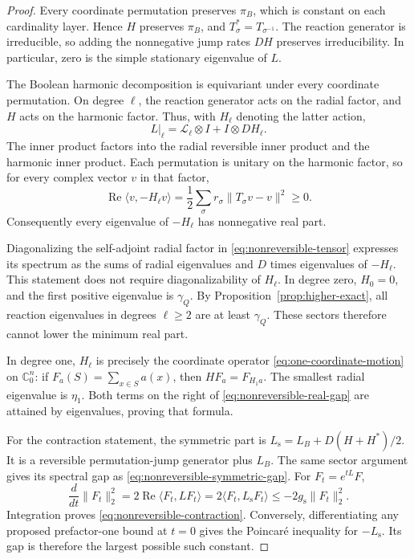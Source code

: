 \begin{proof}
Every coordinate permutation preserves $\pi_B$, which is constant on
each cardinality layer.  Hence $H$ preserves $\pi_B$, and
$T_\sigma^*=T_{\sigma^{-1}}$.  The reaction generator is irreducible,
so adding the nonnegative jump rates $DH$ preserves irreducibility.
In particular, zero is the simple stationary eigenvalue of $L$.

The Boolean harmonic decomposition is equivariant under every
coordinate permutation.  On degree $\ell$, the reaction generator
acts on the radial factor, and $H$ acts on the harmonic factor.
Thus, with $H_\ell$ denoting the latter action,
\begin{equation}\label{eq:nonreversible-tensor}
 L|_\ell=\mathcal L_\ell\otimes I+I\otimes DH_\ell.
\end{equation}
The inner product factors into the radial reversible inner product
and the harmonic inner product.  Each permutation is unitary on the
harmonic factor, so for every complex vector $v$ in that factor,
\[
 \operatorname{Re}\langle v,-H_\ell v\rangle
 =\frac12\sum_\sigma r_\sigma
       \|T_\sigma v-v\|^2\ge0.
\]
Consequently every eigenvalue of $-H_\ell$ has nonnegative real part.

Diagonalizing the self-adjoint radial factor in
\eqref{eq:nonreversible-tensor} expresses its spectrum as the sums of
radial eigenvalues and $D$ times eigenvalues of $-H_\ell$.
This statement does not require diagonalizability of $H_\ell$.
In degree zero, $H_0=0$, and the first positive eigenvalue is
$\gamma_Q$.  By Proposition~\ref{prop:higher-exact}, all reaction
eigenvalues in degrees $\ell\ge2$ are at least $\gamma_Q$.
These sectors therefore cannot lower the minimum real part.

In degree one, $H_\ell$ is precisely the coordinate operator
\eqref{eq:one-coordinate-motion} on $\mathbb C^n_0$:
if $F_a(S)=\sum_{x\in S}a(x)$, then $HF_a=F_{H_1a}$.
The smallest radial eigenvalue is $\eta_1$.
Both terms on the right of \eqref{eq:nonreversible-real-gap} are
attained by eigenvalues, proving that formula.

For the contraction statement, the symmetric part is
$L_{\mathrm{s}}=L_B+D(H+H^*)/2$.
It is a reversible permutation-jump generator plus $L_B$.
The same sector argument gives its spectral gap as
\eqref{eq:nonreversible-symmetric-gap}.  For
$F_t=e^{tL}F$,
\[
 \frac{d}{dt}\|F_t\|_2^2
 =2\operatorname{Re}\langle F_t,LF_t\rangle
 =2\langle F_t,L_{\mathrm{s}}F_t\rangle
 \le-2g_{\mathrm{s}}\|F_t\|_2^2.
\]
Integration proves \eqref{eq:nonreversible-contraction}.
Conversely, differentiating any proposed prefactor-one bound at
$t=0$ gives the Poincar\'e inequality for $-L_{\mathrm{s}}$.
Its gap is therefore the largest possible such constant.
\end{proof}

